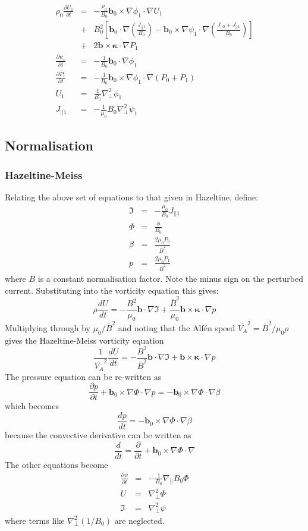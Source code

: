 \documentclass[12pt, a4paper]{article}
\newcommand{\deriv}[2]{\ensuremath{\frac{\partial #1}{\partial #2}}}
\newcommand{\Vec}[1]{\ensuremath{\mathbf{#1}}}
\newcommand{\bvec}{\Vec{b}}
\newcommand{\kvec}{\Vec{\kappa}}
\newcommand{\bxk}{\bvec\times\kvec\cdot\nabla}
\newcommand{\Bbar}{\overline{B}}
\newcommand{\delp}{\nabla_\perp^2}
\begin{document}
\begin{eqnarray}
\rho_0 \deriv{U_1}{t} &=& - \frac{\rho_0}{B_0}\bvec_0\times\nabla\phi_1\cdot\nabla U_1 \nonumber \\
&+& B_0^2\left[\bvec_0\cdot\nabla\left(\frac{J_{||1}}{B_0}\right) - \bvec_0\times\nabla\psi_1\cdot\nabla\left(\frac{J_{||0} + J_{||1}}{B_0}\right)\right] \nonumber \\
&+& 2\bxk P_1 \\
\deriv{\psi_1}{t} &=& -\frac{1}{B_0}\bvec_0\cdot\nabla\phi_1 \\
\deriv{P_1}{t} &=& -\frac{1}{B_0}\bvec_0\times\nabla\phi_1\cdot\nabla\left(P_0 + P_1\right) \\
U_1 &=& \frac{1}{B_0}\delp\phi_1 \\
J_{||1} &=& -\frac{1}{\mu_0}B_0\delp\psi_1
\end{eqnarray}

\subsection{Normalisation}

\subsubsection{Hazeltine-Meiss}

Relating the above set of equations to that given in Hazeltine, define:
\begin{eqnarray*}
\Im &=& -\frac{\mu_0}{B_0}J_{||1} \\
\Phi &=& \frac{\phi}{B_0} \\
\beta &=& \frac{2\mu_0 P_0}{\Bbar^2} \\
p &=& \frac{2\mu_0 P_1}{\Bbar^2}
\end{eqnarray*}
where $\Bbar$ is a constant normalisation factor.
Note the minus sign on the perturbed current. Substituting into the vorticity equation this gives:
\[
\rho \frac{dU}{dt} = -\frac{B^2}{\mu_0}\bvec\cdot\nabla\Im + \frac{\Bbar^2}{\mu_0}\bxk p
\]
Multiplying through by $\mu_0/\Bbar^2$ and noting that the Alf\'en speed $\overline{V_A}^2 = \Bbar^2 / \mu_0\rho$
gives the Hazeltine-Meiss vorticity equation
\[
\frac{1}{\overline{V_A}^2} \frac{dU}{dt} = -\frac{B^2}{\Bbar^2}\bvec\cdot\nabla\Im + \bxk p 
\]
The pressure equation can be re-written as
\[
\deriv{p}{t} + \bvec_0\times\nabla\Phi\cdot\nabla p = -\bvec_0\times\nabla\Phi\cdot\nabla\beta
\]
which becomes
\[
\frac{dp}{dt} = -\bvec_0\times\nabla\Phi\cdot\nabla\beta
\]
because the convective derivative can be written as
\[
\frac{d}{dt} = \deriv{}{t} + \bvec_0\times\nabla\Phi\cdot\nabla
\]
The other equations become
\begin{eqnarray*}
\deriv{\psi}{t} &=& -\frac{1}{B_0}\nabla_{||}B_0\Phi \\
U &=& \delp\Phi \\
\Im &=& \delp\psi 
\end{eqnarray*}
where terms like $\delp\left(1 / B_0\right)$ are neglected.
\end{document}
